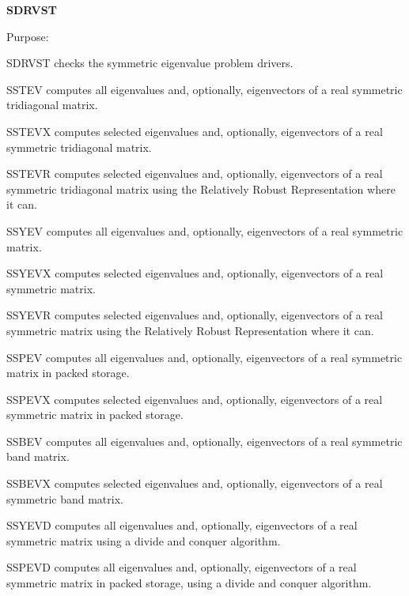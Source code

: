 {\bfseries S\+D\+R\+V\+S\+T} 

\begin{DoxyParagraph}{Purpose\+: }
\begin{DoxyVerb}      SDRVST  checks the symmetric eigenvalue problem drivers.

              SSTEV computes all eigenvalues and, optionally,
              eigenvectors of a real symmetric tridiagonal matrix.

              SSTEVX computes selected eigenvalues and, optionally,
              eigenvectors of a real symmetric tridiagonal matrix.

              SSTEVR computes selected eigenvalues and, optionally,
              eigenvectors of a real symmetric tridiagonal matrix
              using the Relatively Robust Representation where it can.

              SSYEV computes all eigenvalues and, optionally,
              eigenvectors of a real symmetric matrix.

              SSYEVX computes selected eigenvalues and, optionally,
              eigenvectors of a real symmetric matrix.

              SSYEVR computes selected eigenvalues and, optionally,
              eigenvectors of a real symmetric matrix
              using the Relatively Robust Representation where it can.

              SSPEV computes all eigenvalues and, optionally,
              eigenvectors of a real symmetric matrix in packed
              storage.

              SSPEVX computes selected eigenvalues and, optionally,
              eigenvectors of a real symmetric matrix in packed
              storage.

              SSBEV computes all eigenvalues and, optionally,
              eigenvectors of a real symmetric band matrix.

              SSBEVX computes selected eigenvalues and, optionally,
              eigenvectors of a real symmetric band matrix.

              SSYEVD computes all eigenvalues and, optionally,
              eigenvectors of a real symmetric matrix using
              a divide and conquer algorithm.

              SSPEVD computes all eigenvalues and, optionally,
              eigenvectors of a real symmetric matrix in packed
              storage, using a divide and conquer algorithm.


\end{DoxyVerb}
\end{DoxyParagraph}
